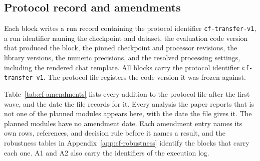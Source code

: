 \documentclass{article}
\begin{document}
\subsection{Protocol record and amendments}
\label{app:repro-protocol}

Each block writes a run record containing the protocol identifier \texttt{cf-transfer-v1}, a run identifier naming the checkpoint and dataset, the evaluation code version that produced the block, the pinned checkpoint and processor revisions, the library versions, the numeric precisions, and the resolved processing settings, including the rendered chat template. All \cfBlocks{} blocks carry the protocol identifier \texttt{cf-transfer-v1}. The protocol file registers the code version it was frozen against.

Table~\ref{tab:cf-amendments} lists every addition to the protocol file after the first wave, and the date the file records for it. Every analysis the paper reports that is not one of the planned modules appears here, with the date the file gives it. The \cfCoveragePlannedWord{} planned modules have no amendment date. Each amendment entry names its own rows, references, and decision rule before it names a result, and the robustness tables in Appendix~\ref{app:cf-robustness} identify the blocks that carry each one. A1 and A2 also carry the identifiers of the execution log.
\end{document}
